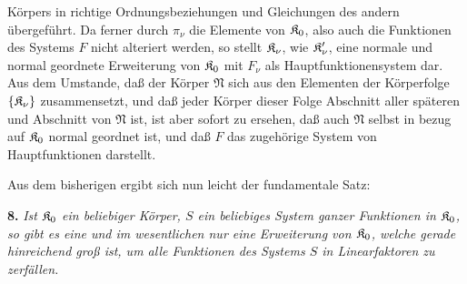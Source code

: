 Körpers in richtige Ordnungsbeziehungen und Gleichungen des andern übergeführt. Da ferner durch $\pi_\nu$ die Elemente von $\mathfrak K_0$, also auch die Funktionen des Systems $F$ nicht alteriert werden, so stellt $\mathfrak K_\nu$, wie $\mathfrak K_\nu'$, eine normale und normal geordnete Erweiterung von $\mathfrak K_0$ mit $F_\nu$ als Hauptfunktionensystem dar. Aus dem Umstande, daß der Körper $\mathfrak N$ sich aus den Elementen der Körperfolge $\{\mathfrak K_\nu\}$ zusammensetzt, und daß jeder Körper dieser Folge Abschnitt aller späteren und Abschnitt von $\mathfrak N$ ist, ist aber sofort zu ersehen, daß auch $\mathfrak N$ selbst in bezug auf $\mathfrak K_0$ normal geordnet ist, und daß $F$ das zugehörige System von Hauptfunktionen darstellt.

Aus dem bisherigen ergibt sich nun leicht der fundamentale Satz:

\textbf{8.} \emph{Ist $\mathfrak K_0$ ein beliebiger Körper, $S$ ein beliebiges System ganzer Funktionen in $\mathfrak K_0$, so gibt es eine und im wesentlichen nur eine Erweiterung von $\mathfrak K_0$, welche gerade hinreichend groß ist, um alle Funktionen des Systems $S$ in Linearfaktoren zu zerfällen.}

